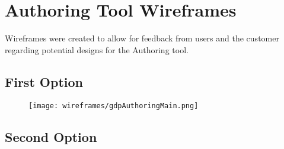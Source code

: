 \chapter{Authoring Tool Wireframes} \label{Chapter:Authoring Tool Wireframes}

Wireframes were created to allow for feedback from users and the customer regarding potential designs for the Authoring tool.


\section{First Option} 

\begin{figure}
	\texttt{[image: wireframes/gdpAuthoringMain.png]}
	\caption{}
	\label{Figure:wireframes/authoringtool/main}
\end{figure}

\section{Second Option} 